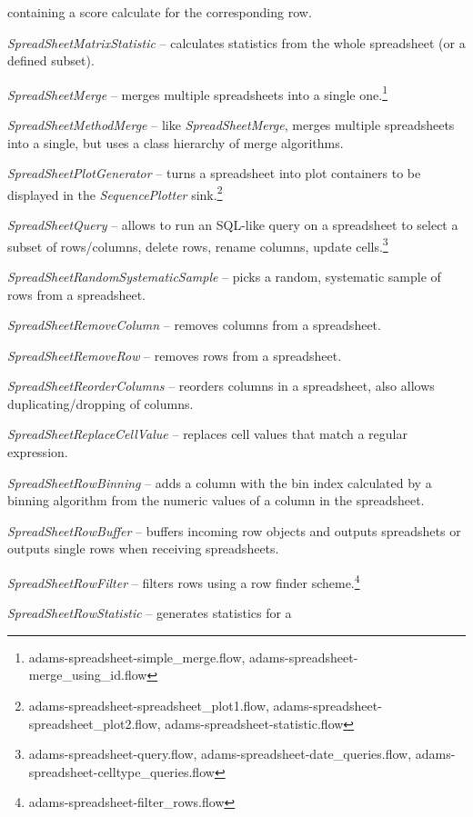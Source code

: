 \documentclass[a4paper]{book}
\begin{document}
\begin{tight_itemize}
	containing a score calculate for the corresponding row.
	\item \textit{SpreadSheetMatrixStatistic} -- calculates statistics from
	the whole spreadsheet (or a defined subset).
	\item \textit{SpreadSheetMerge} -- merges multiple spreadsheets into a single
	one.\footnote{adams-spreadsheet-simple\_merge.flow, adams-spreadsheet-merge\_using\_id.flow}
	\item \textit{SpreadSheetMethodMerge} -- like \textit{SpreadSheetMerge},
	merges multiple spreadsheets into a single, but uses a class hierarchy
	of merge algorithms.
	\item \textit{SpreadSheetPlotGenerator} -- turns a spreadsheet into plot
	containers to be displayed in the \textit{SequencePlotter} 
	sink.\footnote{adams-spreadsheet-spreadsheet\_plot1.flow, 
	adams-spreadsheet-spreadsheet\_plot2.flow, adams-spreadsheet-statistic.flow}
	\item \textit{SpreadSheetQuery} -- allows to run an SQL-like query on a 
	spreadsheet to select a subset of rows/columns, delete rows, rename columns, 
	update cells.\footnote{adams-spreadsheet-query.flow, adams-spreadsheet-date\_queries.flow, 
	adams-spreadsheet-celltype\_queries.flow}
	\item \textit{SpreadSheetRandomSystematicSample} -- picks a random,
	systematic sample of rows from a spreadsheet.
	\item \textit{SpreadSheetRemoveColumn} -- removes columns from a spreadsheet.
	\item \textit{SpreadSheetRemoveRow} -- removes rows from a spreadsheet.
	\item \textit{SpreadSheetReorderColumns} -- reorders columns in a spreadsheet, 
	also allows duplicating/dropping of columns.
	\item \textit{SpreadSheetReplaceCellValue} -- replaces cell values that
	match a regular expression.
	\item \textit{SpreadSheetRowBinning} -- adds a column with the bin index
	calculated by a binning algorithm from the numeric values of a column
	in the spreadsheet.
	\item \textit{SpreadSheetRowBuffer} -- buffers incoming row objects and
	outputs spreadshets or outputs single rows when receiving spreadsheets.
	\item \textit{SpreadSheetRowFilter} -- filters rows using a row
	finder scheme.\footnote{adams-spreadsheet-filter\_rows.flow}
	\item \textit{SpreadSheetRowStatistic} -- generates statistics for a 

\end{tight_itemize}
\end{document}

